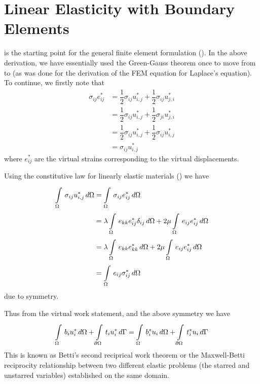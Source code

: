 

\section{Linear Elasticity with Boundary Elements}
\label{sec:Lewbe-4.8}

 is the starting point for the general finite element
formulation (). In the above derivation, we have 
essentially used the Green-Gauss theorem once to move from  
to  (as was done for the derivation of the FEM equation for
Laplace's equation). To continue, we firstly note that
\begin{align*}
  \sigma_{ij}e_{ij}^{*} &= \dfrac{1}{2}\sigma_{ij}u_{i,j}^{*} +
  \dfrac{1}{2}\sigma_{ij}u_{j,i}^{*}\\ 
  &= \dfrac{1}{2}\sigma_{ij}u_{i,j}^{*} + \dfrac{1}{2}\sigma_{ji}u_{j,i} ^{*} \\ 
  &= \dfrac{1}{2}\sigma_{ij}u_{i,j}^{*} + \dfrac{1}{2}\sigma_{ij}u_{i,j} ^{*} \\ 
  &= \sigma_{ij} u_{i,j}^{*}
\end{align*}
where $e_{ij}^{*}$ are the virtual strains corresponding to the virtual
displacements.

Using the constitutive law for linearly elastic materials
() we have
\begin{align*}
     \displaystyle\int\limits_{\Omega}^{} \,\sigma_{ij}u_{i,j}^{*}\,d\Omega   &=
     \displaystyle\int\limits_{\Omega}^{} \,\sigma_{ij} e_{ij}^{*}\,d\Omega   \\ 
  &= \lambda   \displaystyle\int\limits_{\Omega}^{} \,e_{kk} e_{ij}^{*} \delta_{ij}\,d\Omega   + 
  2\mu   \displaystyle\int\limits_{\Omega}^{} \,e_{ij} e_{ij}^{*}\,d\Omega   \\ 
  &= \lambda   \displaystyle\int\limits_{\Omega}^{} \,e_{kk} e_{kk}^{*}\,d\Omega   + 
  2\mu    \displaystyle\int\limits_{\Omega}^{} \,e_{ij} e_{ij}^{*}\,d\Omega   \\ 
  &=    \displaystyle\int\limits_{\Omega}^{} \,e_{ij} \sigma_{ij}^{*}\,d\Omega  
\end{align*}
due to symmetry.

Thus from the virtual work statement,  and the above
symmetry we have
\begin{equation}
     \displaystyle\int\limits_{\Omega}^{} \,b_{i}u_{i}^{*}\,d\Omega   +   \displaystyle\int\limits_{\partial \Omega}^{} \,t_{i}u_{i}^{*}\,d\Gamma  =    \displaystyle\int\limits_{\Omega}^{} \,b_{i}^{*}u_{i}\,d\Omega   + 
    \displaystyle\int\limits_{\partial \Omega}^{} \,t_{i}^{*} u_{i}\,d\Gamma 
  \label{eqn:Bsrwt}
\end{equation}
This is known as Betti's second reciprical work theorem or the Maxwell-Betti
reciprocity relationship between two different elastic problems (the starred
and unstarred variables) established on the same domain.


